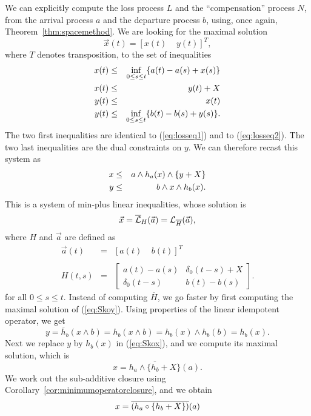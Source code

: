We can explicitly compute the loss process $L$ and the
``compensation'' process $N$, from the arrival process $a$ and the
departure process $b$, using, once again,
Theorem~\ref{thm:spacemethod}. We are looking for the maximal
solution
$$ \vec{x}(t) = [x(t) \;\;\;\; y(t)]^T, $$
where $T$ denotes transposition, to the set of inequalities
\begin{eqnarray}
\mylabel{eq:xa}
x(t) & \leq & \inf_{0 \leq s \leq t} \{a(t) - a(s) + x(s)\} \\
\mylabel{eq:xy}
x(t) & \leq & y(t) + X \\
\mylabel{eq:yx}
y(t) & \leq & x(t) \\
\mylabel{eq:yb}
y(t) & \leq & \inf_{0 \leq s \leq t} \{b(t) - b(s) + y(s)\}.
\end{eqnarray}
The two first inequalities are identical to (\ref{eq:losseq1}) and to (\ref{eq:losseq2}).
The two last inequalities are the dual constraints on $y$.
We can therefore recast this system as
\begin{eqnarray}
\mylabel{eq:Skox}
x & \leq & a \wedge h_a(x) \wedge \{ y + X \} \\
\mylabel{eq:Skoy}
y & \leq & b \wedge x \wedge h_b(x).
\end{eqnarray}
This is a system of min-plus linear inequalities, whose solution is
$$ \vec{x} =  \overline{\mathcal L}_{H} (\vec{a})=  \mathcal L_{\overline{H}} (\vec{a}), $$
where $H$ and $\vec{a}$ are defined as
$$ \begin{array}{rcl}
\vec{a}(t) & = & [ a(t)  \; \; \; \; b(t)  ]^T \\ \\
H(t,s) & = & \left[ \begin{array}{cc} a(t) - a(s) & \delta_0(t-s) + X \\
                    \delta_0(t-s) & b(t) - b(s)  \end{array} \right].
\end{array} $$
for all $0 \leq s \leq t$. Instead of computing $\overline{H}$, we go faster by first computing the maximal solution
of (\ref{eq:Skoy}). Using properties of the linear idempotent operator, we get
$$ y = \overline{h}_b(x \wedge b) = h_{b}(x \wedge b) = h_b(x) \wedge h_b(b) =  h_b(x). $$
Next we replace $y$ by $h_b(x)$ in (\ref{eq:Skox}), and we compute its maximal solution, which is
$$ x = \overline{h_a \wedge \{ h_b + X \}} (a). $$
We work out the sub-additive closure using Corollary~\ref{cor:minimumoperatorclosure}, and  we obtain
\begin{equation}
\mylabel{eq:closure-Sko1}
x = \overline{  \left(  h_{a} \circ \{h_b + X \} \right) } (a)
\end{equation}
